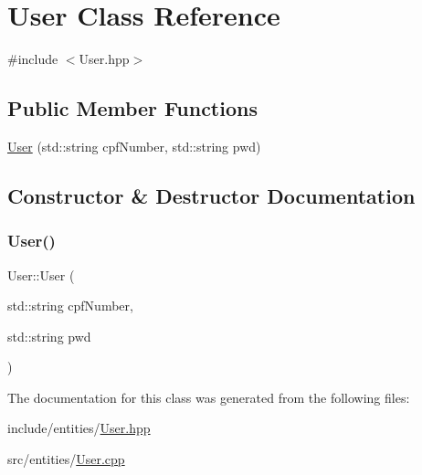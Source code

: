 \hypertarget{class_user}{}\section{User Class Reference}
\label{class_user}


{\ttfamily \#include $<$User.\+hpp$>$}

\subsection*{Public Member Functions}
\begin{DoxyCompactItemize}
\item 
\mbox{\hyperlink{class_user_a7c6d0d15a1c911264af6b190d7f1483b}{User}} (std\+::string cpf\+Number, std\+::string pwd)
\end{DoxyCompactItemize}


\subsection{Constructor \& Destructor Documentation}
\mbox{\label{class_user_a7c6d0d15a1c911264af6b190d7f1483b}} 
\subsubsection{\texorpdfstring{User()}{User()}}
{\footnotesize\ttfamily User\+::\+User (\begin{DoxyParamCaption}\item[{std\+::string}]{cpf\+Number,  }\item[{std\+::string}]{pwd }\end{DoxyParamCaption})}



The documentation for this class was generated from the following files\+:\begin{DoxyCompactItemize}
\item 
include/entities/\mbox{\hyperlink{_user_8hpp}{User.\+hpp}}\item 
src/entities/\mbox{\hyperlink{_user_8cpp}{User.\+cpp}}\end{DoxyCompactItemize}
